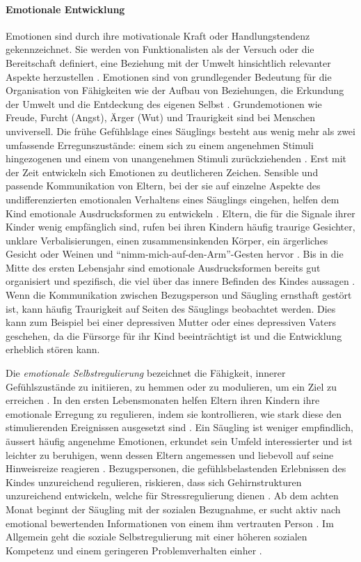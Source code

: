 \paragraph{Emotionale Entwicklung}\label{par:EmotionaleEntwicklung}
Emotionen sind durch ihre motivationale Kraft oder Handlungstendenz gekennzeichnet. Sie werden von Funktionalisten als der Versuch oder die Bereitschaft definiert, eine Beziehung mit der Umwelt hinsichtlich relevanter Aspekte herzustellen \cite[S.~529ff]{Siegler2008}. Emotionen sind von grundlegender Bedeutung für die Organisation von Fähigkeiten wie der Aufbau von Beziehungen, die Erkundung der Umwelt und die Entdeckung des eigenen Selbst \cite{Halle2003, Saarni2006}. Grundemotionen wie Freude, Furcht (Angst), Ärger (Wut) und Traurigkeit sind bei Menschen unviversell. Die frühe Gefühlslage eines Säuglings besteht aus wenig mehr als zwei umfassende Erregunszustände: einem sich zu einem angenehmen Stimuli hingezogenen und einem von unangenehmen Stimuli zurückziehenden \cite{Camras2003, Fox1991}. Erst mit der Zeit entwickeln sich Emotionen zu deutlicheren Zeichen. Sensible und passende Kommunikation von Eltern, bei der sie auf einzelne Aspekte des undifferenzierten emotionalen Verhaltens eines Säuglings eingehen, helfen dem Kind emotionale Ausdrucksformen zu entwickeln \cite{Gergely1999}. Eltern, die für die Signale ihrer Kinder wenig empfänglich sind, rufen bei ihren Kindern häufig traurige Gesichter, unklare Verbalisierungen, einen zusammensinkenden Körper, ein ärgerliches Gesicht oder Weinen und \enquote{nimm-mich-auf-den-Arm}-Gesten hervor \cite{Weinberg1994, Yale1999}. Bis in die Mitte des ersten Lebensjahr sind emotionale Ausdrucksformen bereits gut organisiert und spezifisch, die viel über das innere Befinden des Kindes aussagen \cite{Berk2011}. Wenn die Kommunikation zwischen Bezugsperson und Säugling ernsthaft gestört ist, kann häufig Traurigkeit auf Seiten des Säuglings beobachtet werden. Dies kann zum Beispiel bei einer depressiven Mutter oder eines depressiven Vaters geschehen, da die Fürsorge für ihr Kind beeinträchtigt ist und die Entwicklung erheblich stören kann.

Die \textit{emotionale Selbstregulierung} bezeichnet die Fähigkeit, innerer Gefühlszustände zu initiieren, zu hemmen oder zu modulieren, um ein Ziel zu erreichen \cite{Siegler2008}. In den ersten Lebensmonaten helfen Eltern ihren Kindern ihre emotionale Erregung zu regulieren, indem sie kontrollieren, wie stark diese den stimulierenden Ereignissen ausgesetzt sind \cite{Gianino1988}. Ein Säugling ist weniger empfindlich, äussert häufig angenehme Emotionen, erkundet sein Umfeld interessierter und ist leichter zu beruhigen, wenn dessen Eltern angemessen und liebevoll auf seine Hinweisreize reagieren \cite{Crockenberg2004}. Bezugspersonen, die gefühlsbelastenden Erlebnissen des Kindes unzureichend regulieren, riskieren, dass sich Gehirnstrukturen unzureichend entwickeln, welche für Stressregulierung dienen \cite[S.~250]{Berk2011}. Ab dem achten Monat beginnt der Säugling mit der sozialen Bezugnahme, er sucht aktiv nach emotional bewertenden Informationen von einem ihm vertrauten Person \cite{Mumme2007}. Im Allgemein geht die soziale Selbstregulierung mit einer höheren sozialen Kompetenz und einem geringeren Problemverhalten einher \cite[S.~580]{Siegler2008}. 


